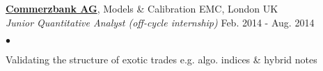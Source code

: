 \documentclass[margin, line]{res}
\newcommand{\cbkPF}{http://www2.warrants.commerzbank.com/Products/ProductSearchAdvanced.aspx?pc=228&c=2181036}
\newcommand{\cbk}{https://www.commerzbank.com/}
\newcommand{\SC}{http://www.jstor.org/discover/10.2307/2330812?uid=3738032&uid=2&uid=4&sid=21104643963563}
\newcommand{\LV}{http://en.wikipedia.org/wiki/Local_volatility}
\newenvironment{list2}{
	\begin{list}{$\bullet$}{%
		\setlength{\itemsep}{0in}
		\setlength{\parsep}{0in} \setlength{\parskip}{0in}
		\setlength{\topsep}{0in} \setlength{\partopsep}{0in}
		\setlength{\leftmargin}{0.2in}}}{\end{list}}
\begin{document}
\begin{resume}
{\bf \href{\cbk}{Commerzbank AG}}, Models \& Calibration EMC, London UK \\
\vspace{-.3cm}
{\em Junior Quantitative Analyst (off-cycle internship)}
\hfill { Feb. 2014 - Aug. 2014}\\

\begin{list2}
\item Validating the structure of exotic trades e.g. algo. indices \& hybrid notes
\end{list2}


\end{resume}
\end{document}
